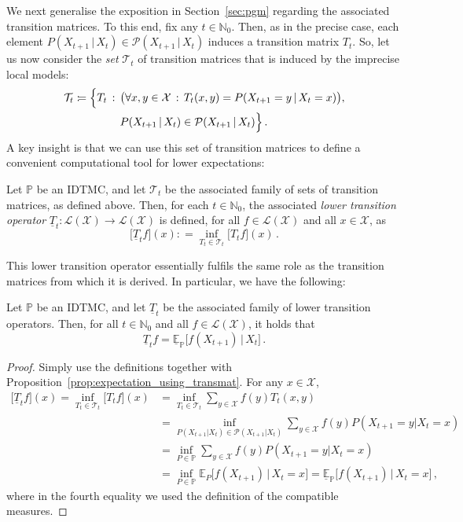 \documentclass[graybox]{svmult}
\newcommand{\nats}{\mathbb{N}}
\newcommand{\natswith}{\nats_{0}}
\newcommand{\states}{\mathcal{X}}
\newcommand{\gambles}{\mathcal{L}}
\newcommand{\gamblesX}{\gambles(\states)}
\newcommand{\coloneqq}{:\!=}
\begin{document}
We next generalise the exposition in Section~\ref{sec:pgm} regarding the associated transition matrices. To this end, fix any $t\in\natswith$. Then, as in the precise case, each element $P(X_{t+1}\,\vert\,X_t)\in\mathcal{P}(X_{t+1}\,\vert\,X_t)$ induces a transition matrix $T_t$. So, let us now consider the \emph{set} $\mathcal{T}_t$ of transition matrices that is induced by the imprecise local models:
\begin{align*}
\mathcal{T}_t \coloneqq \Bigl\{ T_t\,&:\, \bigl(\forall x,y\in\states\,:\, T_t(x,y)=P(X_{t+1}=y\,\vert\,X_t=x)\bigr), \\
 &\quad P(X_{t+1}\,\vert\,X_t)\in\mathcal{P}(X_{t+1}\,\vert\,X_t) \Bigr\}\,.
\end{align*} 
A key insight is that we can use this set of transition matrices to define a convenient computational tool for lower expectations:
\begin{definition}\label{def:lower_discrete_trans}
Let $\mathbb{P}$ be an IDTMC, and let $\mathcal{T}_t$ be the associated family of sets of transition matrices, as defined above. Then, for each $t\in\natswith$, the associated \emph{lower transition operator} $\underline{T}_t:\gamblesX\to\gamblesX$ is defined, for all $f\in\gamblesX$ and all $x\in\states$, as
\begin{equation*}
\bigl[\underline{T}_tf\bigr](x) \coloneqq \inf_{T_t\in\mathcal{T}_t}\bigl[T_tf\bigr](x)\,.
\end{equation*}
\end{definition}
This lower transition operator essentially fulfils the same role as the transition matrices from which it is derived. In particular, we have the following:
\begin{proposition}\label{prop:lower_trans_is_lower_exp}
Let $\mathbb{P}$ be an IDTMC, and let $\underline{T}_t$ be the associated family of lower transition operators. Then, for all $t\in\natswith$ and all $f\in\gamblesX$, it holds that
\begin{equation*}
\underline{T}_tf = \underline{\mathbb{E}}_\mathbb{P}\bigl[f(X_{t+1})\,\vert\,X_t\bigr]\,.
\end{equation*}
\end{proposition}
\begin{proof}
Simply use the definitions together with Proposition~\ref{prop:expectation_using_transmat}. For any $x\in\states$,
\begin{align*}
\bigl[\underline{T}_tf\bigr](x) = \inf_{T_t\in\mathcal{T}_t} \bigl[T_tf\bigr](x) &= \inf_{T_t\in\mathcal{T}_t} \sum_{y\in\states} f(y) T_t(x,y) \\
 &= \inf_{P(X_{t+1}\vert X_t)\in\mathcal{P}(X_{t+1}\vert X_t)} \sum_{y\in\states} f(y) P(X_{t+1}=y\vert X_t=x) \\
 &= \inf_{P\in\mathbb{P}} \sum_{y\in\states} f(y) P(X_{t+1}=y\vert X_t=x) \\
 &= \inf_{P\in\mathbb{P}} \mathbb{E}_P\bigl[f(X_{t+1})\,\big\vert\,X_t=x\bigr] = \underline{\mathbb{E}}_\mathbb{P}\bigl[f(X_{t+1})\,\big\vert\,X_t=x\bigr]\,,
\end{align*}
where in the fourth equality we used the definition of the compatible measures.
\end{proof}
\end{document}
